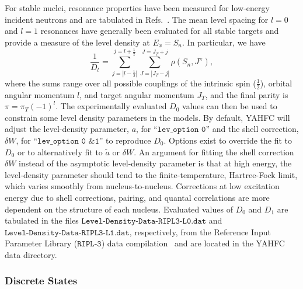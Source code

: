 \documentclass[
10pt,
showpacs,preprintnumbers,footinbib,
amsfonts,amsmath,amssymb,
aps,
prc,twocolumn,groupedaddress,superscriptaddress,
showkeys,
nofootinbib
]{revtex4-1}
\begin{document}
For stable nuclei, resonance properties have been measured for low-energy incident neutrons and are tabulated in Refs.~\cite{Mughabghab-1:2018,Mughabghab-2:2018}. The mean level spacing for $l=0$ and $l=1$ resonances have generally been evaluated for all stable targets and provide a measure of the level density at $E_x=S_n$. In particular, we have
\begin{equation}
\frac{1}{D_l} = \sum_{j=|l-\frac{1}{2}|}^{j=l+\frac{1}{2}}\sum_{J=|J_T-j|}^{J=J_T+j} \rho(S_n,J^\pi),
\end{equation}
where the sums range over all possible couplings of the intrinsic spin ($\frac{1}{2}$), orbital angular momentum $l$, and target angular momentum $J_T$, and the final parity is $\pi = \pi_T(-1)^l$. The experimentally evaluated $D_0$ values can then be used to constrain some level density parameters in the models. 
By default, YAHFC will adjust the level-density parameter,
$a$, for ``${\texttt{lev\_option 0}}$'' and the shell correction, $\delta W$,
for ``${\texttt{lev\_option 0 \& 1}}$'' to reproduce $D_0$. Options exist
to override the fit to $D_0$ or to alternatively fit to $\tilde a$ or $\delta W$.  An argument for fitting the shell correction $\delta W$ instead of the asymptotic level-density parameter is that at high energy, the level-density parameter should tend to the finite-temperature, Hartree-Fock limit, which varies smoothly from nucleus-to-nucleus. Corrections at low excitation energy due to shell corrections, pairing, and quantal correlations are more dependent on the structure of each nucleus. Evaluated values of $D_0$ and $D_1$ are tabulated in the files ${\texttt{Level-Density-Data-RIPL3-L0.dat}}$ and ${\texttt{Level-Density-Data-RIPL3-L1.dat}}$, respectively, from the Reference Input Parameter Library (${\texttt{RIPL-3}}$) data compilation~\cite{Capote:2009,RIPL-3} and are located in the YAHFC data directory.

\subsubsection{Discrete States}
\end{document}
